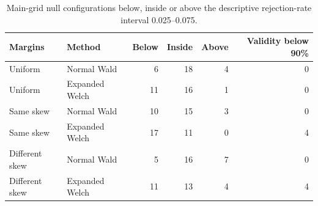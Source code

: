 \begin{table}[htbp]
\centering
\small
\caption{Main-grid null configurations below, inside or above the descriptive rejection-rate interval 0.025--0.075.}
\label{tab:null-band-summary}
\begin{tabular}{@{}llrrrr@{}}
\toprule
Margins & Method & Below & Inside & Above & Validity below 90\%\\
\midrule
Uniform & Normal Wald & 6 & 18 & 4 & 0 \\
Uniform & Expanded Welch & 11 & 16 & 1 & 0 \\
Same skew & Normal Wald & 10 & 15 & 3 & 0 \\
Same skew & Expanded Welch & 17 & 11 & 0 & 4 \\
Different skew & Normal Wald & 5 & 16 & 7 & 0 \\
Different skew & Expanded Welch & 11 & 13 & 4 & 4 \\
\bottomrule
\end{tabular}
\end{table}
